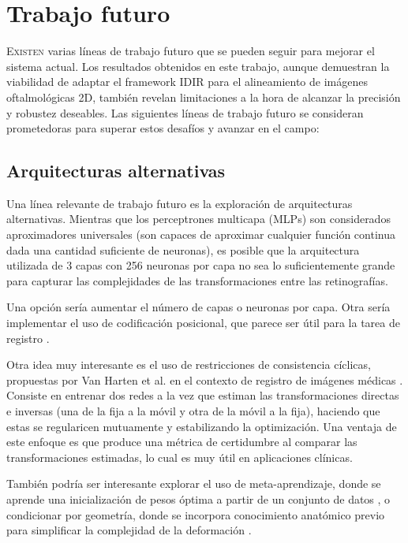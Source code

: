 \chapter{Trabajo futuro}
\label{chap:Traballo futuro}

\lettrine{E}{xisten} varias líneas de trabajo futuro que se pueden seguir para mejorar el sistema actual.
Los resultados obtenidos en este trabajo, aunque demuestran la viabilidad de adaptar el framework IDIR para el alineamiento de imágenes oftalmológicas 2D, también revelan limitaciones a la hora de alcanzar la precisión y robustez deseables.
Las siguientes líneas de trabajo futuro se consideran prometedoras para superar estos desafíos y avanzar en el campo:

\section{Arquitecturas alternativas}
\label{sec:Arquitecturas alternativas}

Una línea relevante de trabajo futuro es la exploración de arquitecturas alternativas.
Mientras que los perceptrones multicapa (MLPs) son considerados aproximadores universales \cite{HORNIK1989359} (son capaces de aproximar cualquier función continua dada una cantidad suficiente de neuronas), es posible que la arquitectura utilizada de 3 capas con 256 neuronas por capa no sea lo suficientemente grande para capturar las complejidades de las transformaciones entre las retinografías.

Una opción sería aumentar el número de capas o neuronas por capa. Otra sería implementar el uso de codificación posicional, que parece ser útil para la tarea de registro \cite{mueller2022instant}.

Otra idea muy interesante es el uso de restricciones de consistencia cíclicas, propuestas por Van Harten et al. en el contexto de registro de imágenes médicas \cite{van_Harten_2024}. Consiste en entrenar dos redes a la vez que estiman las transformaciones directas e inversas (una de la fija a la móvil y otra de la móvil a la fija), haciendo que estas se regularicen mutuamente y estabilizando la optimización.
Una ventaja de este enfoque es que produce una métrica de certidumbre al comparar las transformaciones estimadas, lo cual es muy útil en aplicaciones clínicas.

También podría ser interesante explorar el uso de meta-aprendizaje, donde se aprende una inicialización de pesos óptima a partir de un conjunto de datos \cite{learnedinit}, o condicionar por geometría, donde se incorpora conocimiento anatómico previo para simplificar la complejidad de la deformación \cite{harten2023deformable}.

